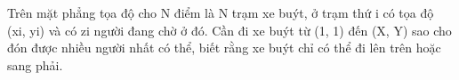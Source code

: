 Trên mặt phẳng tọa độ cho N điểm là N trạm xe buýt, ở trạm thứ i có tọa độ (xi, yi) và có zi người đang chờ ở đó. Cần đi xe buýt từ (1, 1) đến (X, Y) sao cho đón được nhiều người nhất có thể, biết rằng xe buýt chỉ có thể đi lên trên hoặc sang phải.  

\